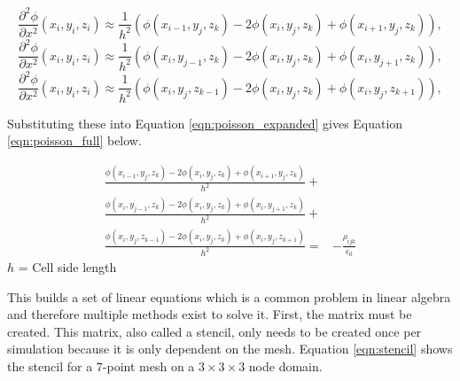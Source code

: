 \begin{equation}
    \label{eqn:x_partial}
    \frac{\partial^2 \phi}{\partial x^2}(x_i,y_i,z_i) \approx \frac{1}{h^2}(\phi(x_{i-1},y_j,z_k) - 2\phi(x_i,y_j,z_k) + \phi(x_{i+1},y_j,z_k)),
\end{equation}
\begin{equation}
    \label{eqn:y_partial}
    \frac{\partial^2 \phi}{\partial x^2}(x_i,y_i,z_i) \approx \frac{1}{h^2}(\phi(x_i,y_{j-1},z_k) - 2\phi(x_i,y_j,z_k) + \phi(x_i,y_{j+1},z_k)),
\end{equation}
\begin{equation}
    \label{eqn:z_partial}
    \frac{\partial^2 \phi}{\partial x^2}(x_i,y_i,z_i) \approx \frac{1}{h^2}(\phi(x_i,y_j,z_{k-1}) - 2\phi(x_i,y_j,z_k) + \phi(x_i,y_j,z_{k+1})),
\end{equation}

Substituting these into Equation \ref{eqn:poisson_expanded} gives Equation \ref{eqn:poisson_full} below.

\begin{align}\label{eqn:poisson_full}
    \frac{\phi(x_{i-1},y_j,z_k) - 2\phi(x_i,y_j,z_k) + \phi(x_{i+1},y_j,z_k)}{h^2} +& \nonumber \\
    \frac{\phi(x_i,y_{j-1},z_k) - 2\phi(x_i,y_j,z_k) + \phi(x_i,y_{j+1},z_k)}{h^2} +& \nonumber \\
    \frac{\phi(x_i,y_j,z_{k-1}) - 2\phi(x_i,y_j,z_k) + \phi(x_i,y_j,z_{k+1})}{h^2} =& - \frac{\rho_{ijk}}{\epsilon_0}
\end{align}
\(h\) = Cell side length \par

This builds a set of linear equations which is a common problem in linear algebra and therefore multiple methods exist to solve it. First, the matrix must be created. This matrix, also called a stencil, only needs to be created once per simulation because it is only dependent on the mesh. Equation \ref{eqn:stencil} shows the stencil for a 7-point mesh on a \(3\times3\times3\) node domain. \par

